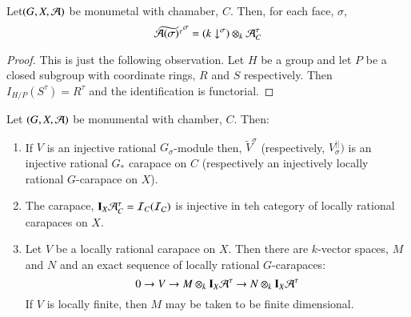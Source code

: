 \begin{seclem}\label{chap6-lemma-14.7}
Let\pageoriginale $(G, X, \mathcal{A})$ be monumetal with chamaber, $C$. Then, for each face, $\sigma$,
$$
\widetilde{\mathcal{A}(\sigma)^{\tau}}^{\sigma} = (k \downarrow^{\sigma})\otimes_{k} \mathcal{A}_{C}^{\tau}
$$ 
\end{seclem}

\begin{proof}
This is just the following observation. Let $H$ be a group and let $P$ be a closed subgroup with coordinate rings, $R$ and $S$ respectively. Then $I_{H/P}(S^{\tau}) = R^{\tau}$ and the identification is functorial.
\end{proof}

\begin{secthm}\label{chap6-thm-14.8}
Let $(G, X, \mathcal{A})$ be monumental with chamber, $C$. Then:
\begin{enumerate}[(1)]
\item If $V$ is an injective rational $G_{\sigma}$-module then, $\widetilde{V}^{\sigma}$ (respectively, $V_{\sigma}^{||})$ is an injective rational  $G_{*}$ carapace on $C$ (respectively an injectively locally rational $G$-carapace on $X$).\label{chap6-thm14.8-enum-1}

\item The carapace, $\mathbf{I}_{X}\mathcal{A}_{C}^{\tau} = \mathcal{I}_{C}(\mathcal{I} \cal_{C})$ is injective in teh category of locally rational carapaces on $X$.\label{chap6-thm14.8-enum-2}

\item  Let $V$ be a locally rational carapace on $X$. Then there are $k$-vector spaces, $M$ and $N$ and an exact sequence of locally rational $G$-carapaces:\label{chap6-thm14.8-enum-3}
$$
0 \rightarrow V \rightarrow M \otimes_{k}\mathbf{I}_{X}\mathcal{A}^{\tau} \rightarrow N \otimes_{k}\mathbf{I}_{X}\mathcal{A}^{\tau}
$$
If $V$ is locally finite, then $M$ may be taken to be finite dimensional.
\end{enumerate}
\end{secthm}

